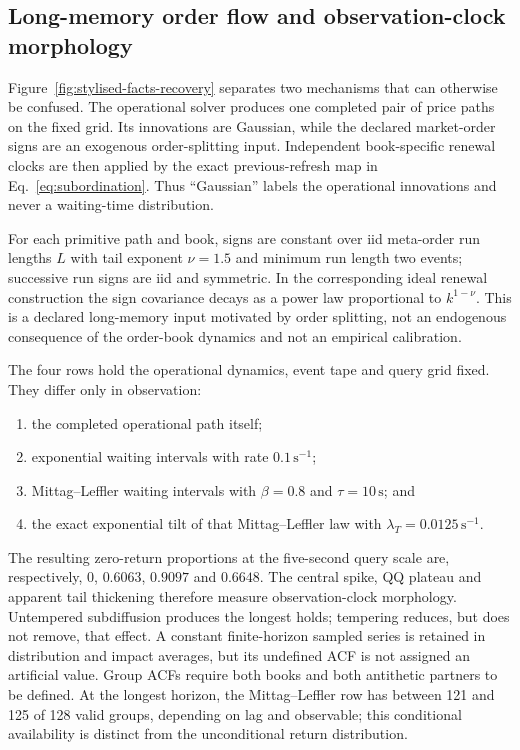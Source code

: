 
\subsection{Long-memory order flow and observation-clock morphology}
\label{app:stylised-facts-recovery}

Figure~\ref{fig:stylised-facts-recovery} separates two mechanisms that can
otherwise be confused.  The operational solver produces one completed pair of
price paths on the fixed grid.  Its innovations are Gaussian, while the
declared market-order signs are an exogenous order-splitting input.  Independent
book-specific renewal clocks are then applied by the exact previous-refresh
map in Eq.~\eqref{eq:subordination}.  Thus ``Gaussian'' labels the operational
innovations and never a waiting-time distribution.

For each primitive path and book, signs are constant over iid meta-order run
lengths $L$ with tail exponent $\nu=1.5$ and minimum run length two events;
successive run signs are iid and symmetric.  In the corresponding ideal
renewal construction the sign covariance decays as a power law proportional
to $k^{1-\nu}$.  This is a declared long-memory input motivated by order
splitting, not an endogenous consequence of the order-book dynamics and not an
empirical calibration.

The four rows hold the operational dynamics, event tape and query grid fixed.
They differ only in observation:
\begin{enumerate}
\item the completed operational path itself;
\item exponential waiting intervals with rate $0.1\,\mathrm{s}^{-1}$;
\item Mittag--Leffler waiting intervals with $\beta=0.8$ and
  $\tau=10\,\mathrm{s}$; and
\item the exact exponential tilt of that Mittag--Leffler law with
  $\lambda_T=0.0125\,\mathrm{s}^{-1}$.
\end{enumerate}
The resulting zero-return proportions at the five-second query scale are,
respectively, $0$, $0.6063$, $0.9097$ and $0.6648$.  The central spike, QQ
plateau and apparent tail thickening therefore measure observation-clock
morphology.  Untempered subdiffusion produces the longest holds; tempering
reduces, but does not remove, that effect.  A constant finite-horizon sampled
series is retained in distribution and impact averages, but its undefined ACF is not assigned an artificial value. Group ACFs require both books and both antithetic partners to be defined. At the longest horizon, the Mittag--Leffler row has between 121 and 125 of 128 valid groups, depending on lag and observable; this conditional availability is distinct from the unconditional return distribution.

